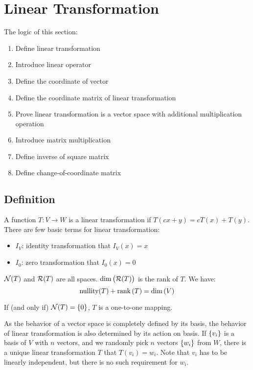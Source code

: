
\section{Linear Transformation}

The logic of this section:
\begin{enumerate}
    \item Define linear transformation
    \item Introduce linear operator
    \item Define the coordinate of vector
    \item Define the coordinate matrix of linear transformation
    \item Prove linear transformation is a vector space with additional multiplication operation
    \item Introduce matrix multiplication
    \item Define inverse of square matrix
    \item Define change-of-coordinate matrix
\end{enumerate}

\subsection{Definition}
A function $T:V \rightarrow W$ is a linear transformation if $T(cx + y) = cT(x) + T(y)$. There are few basic terms for linear transformation:
\begin{itemize}
    \item $I_V$: identity transformation that $I_V (x) = x$
    \item $I_0$: zero transformation that $I_0 (x) = 0$
\end{itemize}

$\mathcal{N}(T)$ and $\mathcal{R}(T)$ are all spaces. $\displaystyle \mathrm{dim}\left( \mathcal{R}(T) \right)$ is the rank of $T$. We have:
\begin{equation}
    \text{nullity}(T) + \displaystyle \mathrm{rank}\left( T \right) = \displaystyle \mathrm{dim}\left( V \right)
\end{equation}

If (and only if) $\mathcal{N}(T) = \set{0}$, $T$ is a one-to-one mapping.

As the behavior of a vector space is completely defined by its basis, the behavior of linear transformation is also determined by its action on basis. If $\set{v_i}$ is a basis of $V$ with $n$ vectors, and we randomly pick $n$ vectors $\set{w_i}$ from $W$, there is a unique linear transformation $T$ that $T(v_i) = w_i$. Note that $v_i$ has to be linearly independent, but there is no such requirement for $w_i$.


